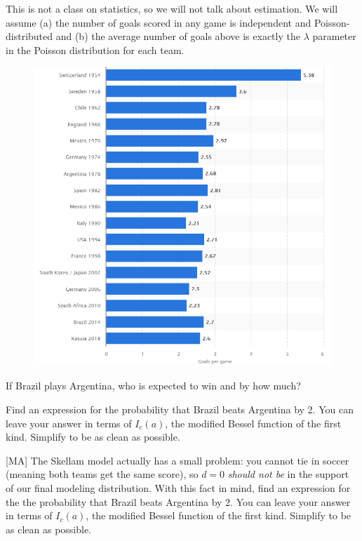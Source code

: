 \documentclass[12pt]{article}
\begin{document}
This is not a class on statistics, so we will not talk about estimation. We will assume (a) the number of goals scored in any game is independent and Poisson-distributed and (b) the average number of goals above is exactly the $\lambda$ parameter in the Poisson distribution for each team.


\begin{figure}[h]
\centering
\includegraphics[width=4.5in]{goals_data.png}
\end{figure}

 If Brazil plays Argentina, who is expected to win and by how much?

 Find an expression for the probability that Brazil beats Argentina by 2. You can leave your answer in terms of $I_c(a)$, the modified Bessel function of the first kind. Simplify to be as clean as possible.

 [MA] The Skellam model actually has a small problem: you cannot tie in soccer (meaning both teams get the same score), so $d = 0$ \textit{should not be} in the support of our final modeling distribution. With this fact in mind, find an expression for the the probability that Brazil beats Argentina by 2. You can leave your answer in terms of $I_c(a)$, the modified Bessel function of the first kind. Simplify to be as clean as possible.




\eenum
\end{document}
